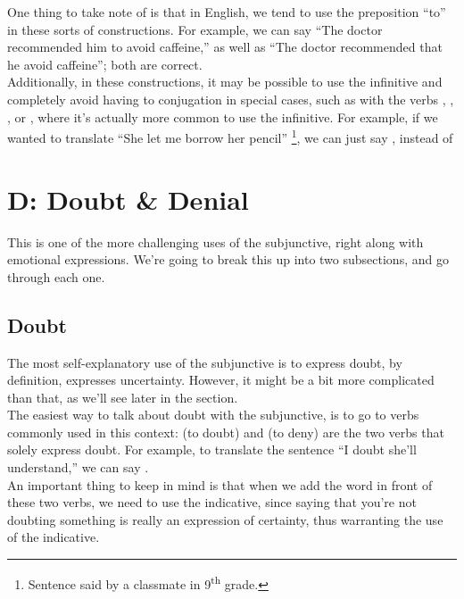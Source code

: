 One thing to take note of is that in English, we tend to use the preposition ``to'' in these sorts of constructions. For example, we can say ``The doctor recommended him to avoid caffeine,'' as well as ``The doctor recommended that he avoid caffeine''; both are correct.\\ 

Additionally, in these constructions, it may be possible to use the infinitive and completely avoid having to conjugation in special cases, such as with the verbs ,  , , or , where it's actually more common to use the infinitive. For example, if we wanted to translate ``She let me borrow her pencil'' \footnote{Sentence said by a classmate in 9\textsuperscript{th} grade.}, we can just say , instead of 
\section{D: Doubt \& Denial}

This is one of the more challenging uses of the subjunctive, right along with emotional expressions. We're going to break this up into two subsections, and go through each one. 

\subsection{Doubt}

The most self-explanatory use of the subjunctive is to express doubt, by definition, expresses uncertainty. However, it might be a bit more complicated than that, as we'll see later in the section. \\

The easiest way to talk about doubt with the subjunctive, is to go to verbs commonly used in this context:  (to doubt) and  (to deny) are the two verbs that solely express doubt. For example, to translate the sentence ``I doubt she'll understand,'' we can say . \\

An important thing to keep in mind is that when we add the word  in front of these two verbs, we need to use the indicative, since saying that you're not doubting something is really an expression of certainty, thus warranting the use of the indicative.
